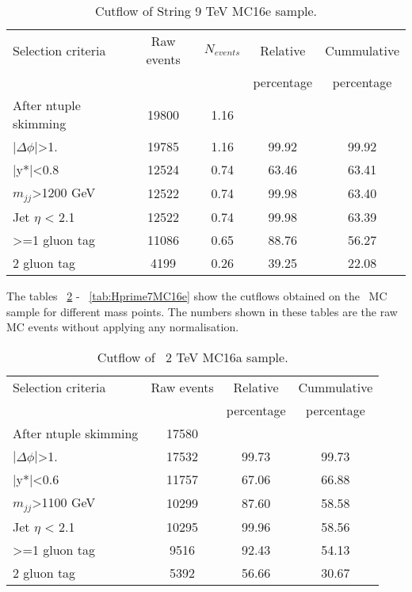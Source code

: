 \begin{table}[ht]
\begin{center}
\begin{tabular}{|l|c|c|c|c|}
\hline
Selection criteria & Raw events & $N_{events}$ & Relative & Cummulative \\
 & & & percentage & percentage \\
\hline
After ntuple skimming & 19800 & 1.16 &  &  \\
$|\Delta\phi|$>1. & 19785 & 1.16 & 99.92 & 99.92 \\
|y*|<0.8 & 12524 & 0.74 & 63.46 & 63.41 \\
$m_{jj}$>1200 GeV & 12522 & 0.74 & 99.98 & 63.40 \\
Jet $\eta$ < 2.1 & 12522 & 0.74 & 99.98 & 63.39 \\
>=1 gluon tag & 11086 & 0.65 & 88.76 & 56.27 \\
2 gluon tag & 4199 & 0.26 & 39.25 & 22.08 \\
\hline
\end{tabular}
\end{center}
\caption{Cutflow of String 9 TeV MC16e sample.}
\label{tab:String9MC16e}
\end{table}

The tables ~\ref{tab:Hprime2MC16a} -  ~\ref{tab:Hprime7MC16e} show the cutflows obtained on the \Hprime\ MC sample for different mass points. 
The numbers shown in these tables are the raw MC events without applying any normalisation.

\begin{table}[ht]
\begin{center}
\begin{tabular}{|l|c|c|c|}
\hline
Selection criteria & Raw events &  Relative & Cummulative \\
 & & percentage & percentage \\
\hline
After ntuple skimming & 17580 &  &  \\
$|\Delta\phi|$>1. & 17532 & 99.73 & 99.73 \\
|y*|<0.6 & 11757 & 67.06 & 66.88 \\
$m_{jj}$>1100 GeV & 10299 & 87.60 & 58.58 \\
Jet $\eta$ < 2.1 & 10295 & 99.96 & 58.56 \\
>=1 gluon tag & 9516 & 92.43 & 54.13 \\
2 gluon tag & 5392 & 56.66 & 30.67 \\
\hline
\end{tabular}
\end{center}
\caption{Cutflow of \Hprime\ 2 TeV MC16a sample.}
\label{tab:Hprime2MC16a}
\end{table}

